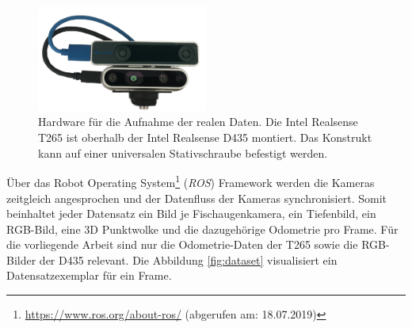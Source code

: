 \begin{figure}[H]
	\centering
	\includegraphics[width=0.5\textwidth]{images/real_dataset/t265_d435_2.png}
	\caption{Hardware für die Aufnahme der realen Daten. Die Intel Realsense T265 ist oberhalb der Intel Realsense D435 montiert. Das Konstrukt kann auf einer universalen Stativschraube befestigt werden.  }
	\label{fig:t265_d435}
\end{figure}

Über das Robot Operating System\footnote{\url{https://www.ros.org/about-ros/} (abgerufen am: 18.07.2019)} (\textit{ROS}) Framework werden die Kameras zeitgleich angesprochen und der Datenfluss der Kameras synchronisiert. Somit beinhaltet jeder Datensatz ein Bild je Fischaugenkamera, ein Tiefenbild, ein RGB-Bild, eine 3D Punktwolke und die dazugehörige Odometrie pro Frame. Für die vorliegende Arbeit sind nur die Odometrie-Daten der T265 sowie die RGB-Bilder der D435 relevant. Die Abbildung \ref{fig:dataset} visualisiert ein Datensatzexemplar für ein Frame.


